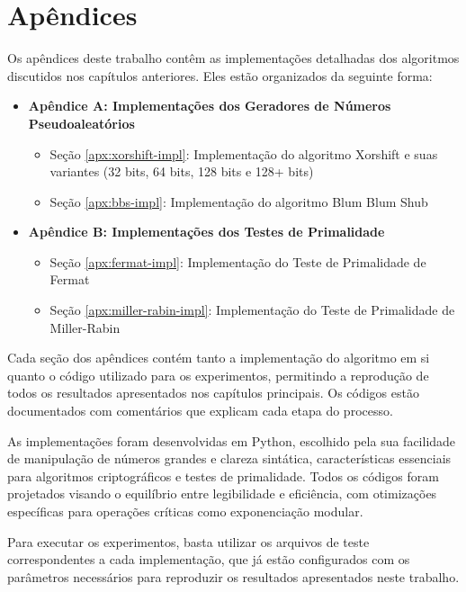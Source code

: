 \appendix

\chapter{Apêndices}

Os apêndices deste trabalho contêm as implementações detalhadas dos algoritmos discutidos nos capítulos anteriores. Eles estão organizados da seguinte forma:

\begin{itemize}
    \item \textbf{Apêndice A: Implementações dos Geradores de Números Pseudoaleatórios}
    \begin{itemize}
        \item Seção \ref{apx:xorshift-impl}: Implementação do algoritmo Xorshift e suas variantes (32 bits, 64 bits, 128 bits e 128+ bits)
        \item Seção \ref{apx:bbs-impl}: Implementação do algoritmo Blum Blum Shub
    \end{itemize}
    
    \item \textbf{Apêndice B: Implementações dos Testes de Primalidade}
    \begin{itemize}
        \item Seção \ref{apx:fermat-impl}: Implementação do Teste de Primalidade de Fermat
        \item Seção \ref{apx:miller-rabin-impl}: Implementação do Teste de Primalidade de Miller-Rabin
    \end{itemize}
\end{itemize}

Cada seção dos apêndices contém tanto a implementação do algoritmo em si quanto o código utilizado para os experimentos, permitindo a reprodução de todos os resultados apresentados nos capítulos principais. Os códigos estão documentados com comentários que explicam cada etapa do processo.

As implementações foram desenvolvidas em Python, escolhido pela sua facilidade de manipulação de números grandes e clareza sintática, características essenciais para algoritmos criptográficos e testes de primalidade. Todos os códigos foram projetados visando o equilíbrio entre legibilidade e eficiência, com otimizações específicas para operações críticas como exponenciação modular.

Para executar os experimentos, basta utilizar os arquivos de teste correspondentes a cada implementação, que já estão configurados com os parâmetros necessários para reproduzir os resultados apresentados neste trabalho.


 


